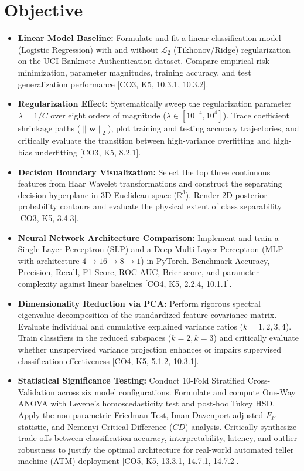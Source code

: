 \documentclass[12pt,a4paper]{article}
\begin{document}
\section{Objective}
\begin{itemize}
    \item \textbf{Linear Model Baseline:} Formulate and fit a linear classification model (Logistic Regression) with and without $\mathcal{L}_2$ (Tikhonov/Ridge) regularization on the UCI Banknote Authentication dataset. Compare empirical risk minimization, parameter magnitudes, training accuracy, and test generalization performance [CO3, K5, 10.3.1, 10.3.2].
    \item \textbf{Regularization Effect:} Systematically sweep the regularization parameter $\lambda = 1/C$ over eight orders of magnitude ($\lambda \in [10^{-4}, 10^4]$). Trace coefficient shrinkage paths ($\|\mathbf{w}\|_2$), plot training and testing accuracy trajectories, and critically evaluate the transition between high-variance overfitting and high-bias underfitting [CO3, K5, 8.2.1].
    \item \textbf{Decision Boundary Visualization:} Select the top three continuous features from Haar Wavelet transformations and construct the separating decision hyperplane in 3D Euclidean space ($\mathbb{R}^3$). Render 2D posterior probability contours and evaluate the physical extent of class separability [CO3, K5, 3.4.3].
    \item \textbf{Neural Network Architecture Comparison:} Implement and train a Single-Layer Perceptron (SLP) and a Deep Multi-Layer Perceptron (MLP with architecture $4 \to 16 \to 8 \to 1$) in PyTorch. Benchmark Accuracy, Precision, Recall, F1-Score, ROC-AUC, Brier score, and parameter complexity against linear baselines [CO4, K5, 2.2.4, 10.1.1].
    \item \textbf{Dimensionality Reduction via PCA:} Perform rigorous spectral eigenvalue decomposition of the standardized feature covariance matrix. Evaluate individual and cumulative explained variance ratios ($k=1, 2, 3, 4$). Train classifiers in the reduced subspaces ($k=2, k=3$) and critically evaluate whether unsupervised variance projection enhances or impairs supervised classification effectiveness [CO4, K5, 5.1.2, 10.3.1].
    \item \textbf{Statistical Significance Testing:} Conduct 10-Fold Stratified Cross-Validation across six model configurations. Formulate and compute One-Way ANOVA with Levene's homoscedasticity test and post-hoc Tukey HSD. Apply the non-parametric Friedman Test, Iman-Davenport adjusted $F_F$ statistic, and Nemenyi Critical Difference ($CD$) analysis. Critically synthesize trade-offs between classification accuracy, interpretability, latency, and outlier robustness to justify the optimal architecture for real-world automated teller machine (ATM) deployment [CO5, K5, 13.3.1, 14.7.1, 14.7.2].
\end{itemize}
\end{document}
